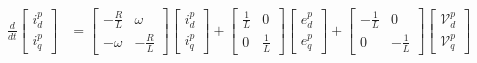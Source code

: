 \begin{equation}
    \begin{split}
        \frac{d}{dt}
        \begin{bmatrix}
            i^{p}_{d} \\
            i^{p}_{q}
        \end{bmatrix}
        &=
        \begin{bmatrix}
            -\frac{R}{L} & \omega       \\
            -\omega      & -\frac{R}{L}
        \end{bmatrix}
        \begin{bmatrix}
            i^{p}_{d} \\
            i^{p}_{q}
        \end{bmatrix}
        +
        \begin{bmatrix}
            \frac{1}{L} & 0           \\
            0           & \frac{1}{L}
        \end{bmatrix}
        \begin{bmatrix}
            e^{p}_{d} \\
            e^{p}_{q}
        \end{bmatrix}
        +
        \begin{bmatrix}
            -\frac{1}{L} & 0            \\
            0            & -\frac{1}{L}
        \end{bmatrix}
        \begin{bmatrix}
            \mathcal{V}^{p}_{d} \\
            \mathcal{V}^{p}_{q}
        \end{bmatrix}
    \end{split}
    \label{eq:state_space_dq_positive}
\end{equation}
